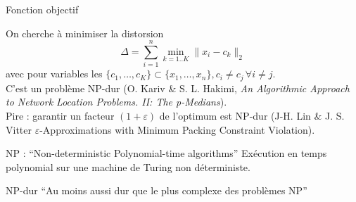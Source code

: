 \begin{frame}{Fonction objectif}

On cherche à minimiser la distorsion
$$\Delta = \sum_{i=1}^{n} \min_{k=1..K} \| x_i - c_k \|_2^{}$$
avec pour variables les $\{c_1,\dots,c_K\} \subset \{x_1,\dots,x_n\}, c_i \neq c_j \,  \forall i \neq j$.\\[0.3cm]

C'est un problème NP-dur {\footnotesize (O. Kariv \& S. L. Hakimi, \emph{An Algorithmic Approach to Network Location Problems. II: The p-Medians})}.\\[0.1cm]

Pire : garantir un facteur $(1+\varepsilon)$ de l'optimum est NP-dur 
{\footnotesize (J-H. Lin \& J. S. Vitter $\varepsilon$-Approximations with Minimum Packing Constraint Violation)}.\\[0.2cm]%

\begin{block}{NP : ``Non-deterministic Polynomial-time algorithms''}
{\footnotesize Exécution en temps polynomial sur une machine de Turing non déterministe.}
\end{block}

\begin{block}{NP-dur}
``Au moins aussi dur que le plus complexe des problèmes NP''
\end{block}


\end{frame}

